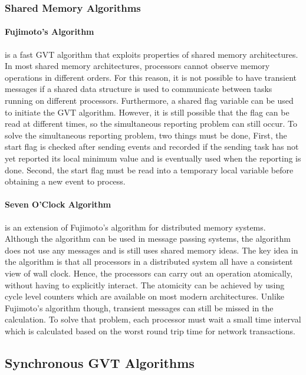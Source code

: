 \documentclass[11pt]{book}
\begin{document}
\subsubsection{Shared Memory Algorithms}

\paragraph{Fujimoto's Algorithm}\cite{fujimoto-94} is a fast GVT algorithm that exploits
properties of shared memory architectures. In most shared memory architectures, processors
cannot observe memory operations in different orders. For this reason, it is not possible
to have transient messages if a shared data structure is used to communicate between tasks
running on different processors. Furthermore, a shared flag variable can be used to initiate
the GVT algorithm. However, it is still possible that the flag can be read at different
times, so the simultaneous reporting problem can still occur. To solve the simultaneous
reporting problem, two things must be done, First, the start flag is checked after sending
events and recorded if the sending task has not yet reported its local minimum value and
is eventually used when the reporting is done. Second, the start flag must be read into a
temporary local variable before obtaining a new event to process.

\paragraph{Seven O'Clock Algorithm}\cite{bauer-05} is an extension of Fujimoto's algorithm
for distributed memory systems. Although the algorithm can be used in message passing systems,
the algorithm does not use any messages and is still uses shared memory ideas. The key idea
in the algorithm is that all processors in a distributed system all have a consistent view
of wall clock. Hence, the processors can carry out an operation atomically, without having
to explicitly interact. The atomicity can be achieved by using cycle level counters which
are available on most modern architectures. Unlike Fujimoto's algorithm though, transient
messages can still be missed in the calculation. To solve that problem, each processor must
wait a small time interval which is calculated based on the worst round trip time for
network transactions.

\subsection{Synchronous GVT Algorithms}
\end{document}
